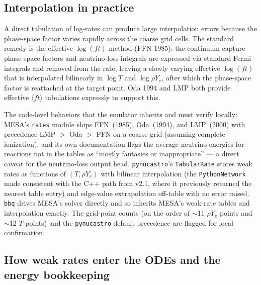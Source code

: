 \documentclass[11pt]{article}
\begin{document}
\subsection{Interpolation in practice}

A direct tabulation of log-rates can produce large interpolation errors because the phase-space factor varies rapidly across the coarse grid cells. The standard remedy is the effective-$\log(ft)$ method (FFN 1985): the continuum capture phase-space factors and neutrino-loss integrals are expressed via standard Fermi integrals and removed from the rate, leaving a slowly varying effective $\log(ft)$ that is interpolated bilinearly in $\log T$ and $\log \rho Y_e$, after which the phase-space factor is reattached at the target point. Oda 1994 and LMP both provide effective $\langle ft\rangle$ tabulations expressly to support this.

The code-level behaviors that the emulator inherits and must verify locally: MESA's \texttt{rates} module ships FFN~(1985), Oda~(1994), and LMP~(2000) with precedence LMP $>$ Oda $>$ FFN on a coarse grid (assuming complete ionization), and its own documentation flags the average neutrino energies for reactions not in the tables as ``mostly fantasies or inappropriate'' --- a direct caveat for the neutrino-loss output head. \texttt{pynucastro}'s \texttt{TabularRate} stores weak rates as functions of $(T, \rho Y_e)$ with bilinear interpolation (the \texttt{PythonNetwork} made consistent with the C++ path from v2.1, where it previously returned the nearest table entry) and edge-value extrapolation off-table with no error raised. \texttt{bbq} drives MESA's solver directly and so inherits MESA's weak-rate tables and interpolation exactly. The grid-point counts (on the order of $\sim$11 $\rho Y_e$ points and $\sim$12 $T$ points) and the \texttt{pynucastro} default precedence are flagged for local confirmation.

\subsection{How weak rates enter the ODEs and the energy bookkeeping}
\end{document}
